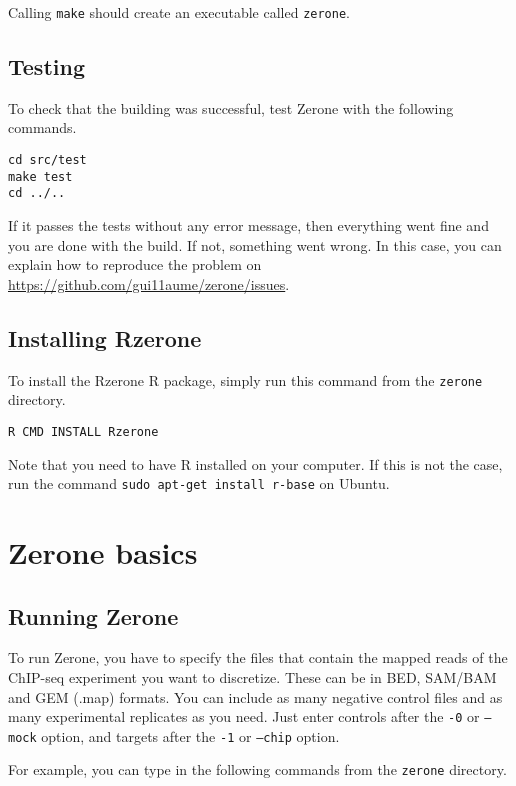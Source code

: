\documentclass[12pt]{article}
\begin{document}
Calling \texttt{make} should create an executable called \texttt{zerone}.

\subsection{Testing}

To check that the building was successful, test Zerone with
the following commands.

\begin{verbatim}
cd src/test
make test
cd ../..
\end{verbatim}

If it passes the tests without any error message, then everything went fine
and you are done with the build. If not, something went
wrong. In this case, you can explain how to reproduce the problem
on \url{https://github.com/gui11aume/zerone/issues}.

\subsection*{Installing Rzerone}

To install the Rzerone R package, simply run this command from the
\texttt{zerone} directory.

\begin{verbatim}
R CMD INSTALL Rzerone
\end{verbatim}

Note that you need to have R installed on your computer. If this is not the
case, run the command \texttt{sudo apt-get install r-base} on Ubuntu.

\section{Zerone basics}

\subsection{Running Zerone}

To run Zerone, you have to specify the files that contain the mapped reads
of the ChIP-seq experiment you want to discretize. These can be in BED,
SAM/BAM and GEM (.map) formats. You can include as many negative control
files and as many experimental replicates as you need. Just enter controls
after the \texttt{-0} or \texttt{--mock} option, and targets
after the \texttt{-1} or \texttt{--chip} option.

For example, you can type in the following commands from the \texttt{zerone}
directory.
\end{document}
